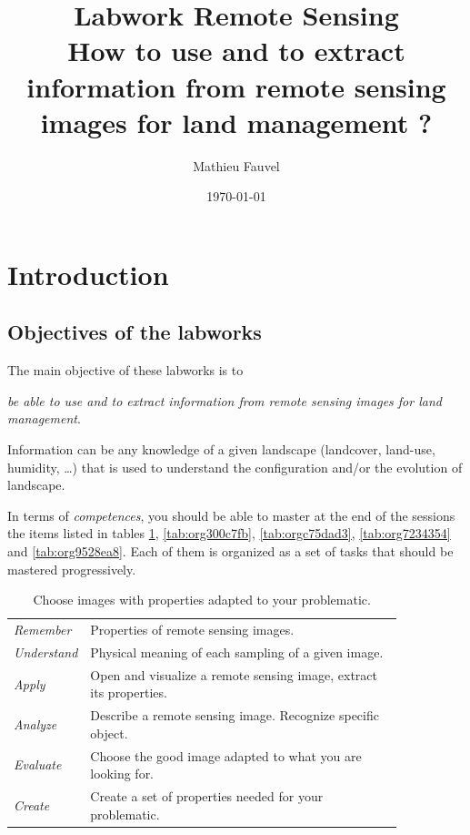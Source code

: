 \documentclass[a4paper,11pt,DIV=18]{scrartcl}
\author{Mathieu Fauvel}
\date{\today}
\title{Labwork Remote Sensing\\\medskip
\large How to use and to extract information from remote sensing images for land management ?}
\begin{document}
\maketitle
\setcounter{tocdepth}{2}
\tableofcontents

\section{Introduction}
\label{sec:orge7673d8}
\subsection{Objectives of the labworks}
\label{sec:org68745c8}
The main objective of these labworks is to
\begin{center}
\emph{be able to  use and to extract information from  remote sensing images
for land management}.
\end{center}
Information  can be  any knowledge  of a  given landscape  (landcover,
land-use, humidity, \ldots{})  that is used to understand the configuration
and/or the evolution of landscape.

In terms of  \emph{competences}, you should be  able to master at  the end of
the sessions  the items listed in  tables \ref{tab:org7a3c27d}, \ref{tab:org300c7fb}, \ref{tab:orgc75dad3},  \ref{tab:org7234354} and \ref{tab:org9528ea8}.
Each of them  is organized as a  set of tasks that  should be mastered
progressively.

\begin{table}[htbp]
\caption{\label{tab:org7a3c27d}
Choose images with properties adapted to your problematic.}
\centering
\begin{tabular}{lp{0.85\linewidth}}
\toprule
\emph{Remember} & Properties of remote sensing images.\\
\emph{Understand} & Physical meaning of each sampling of a given image.\\
\emph{Apply} & Open and visualize a remote sensing image, extract its properties.\\
\emph{Analyze} & Describe a remote sensing image. Recognize specific object.\\
\emph{Evaluate} & Choose the good image adapted to what you are looking for.\\
\emph{Create} & Create a set of properties needed for your problematic.\\
\bottomrule
\end{tabular}
\end{table}
\end{document}
